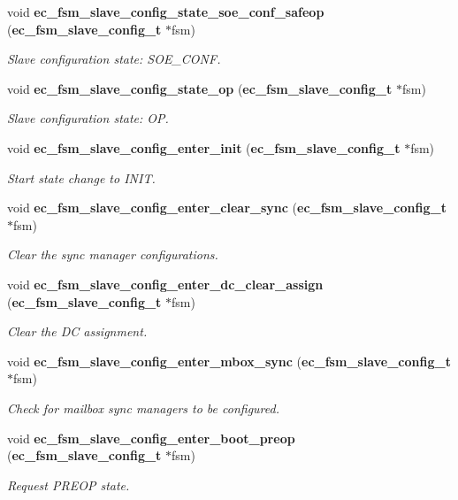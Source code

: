 \begin{DoxyCompactItemize}
void {\bf ec\-\_\-fsm\-\_\-slave\-\_\-config\-\_\-state\-\_\-soe\-\_\-conf\-\_\-safeop} ({\bf ec\-\_\-fsm\-\_\-slave\-\_\-config\-\_\-t} $\ast$fsm)
\begin{DoxyCompactList}\small\item\em Slave configuration state\-: S\-O\-E\-\_\-\-C\-O\-N\-F. \end{DoxyCompactList}\item 
void {\bf ec\-\_\-fsm\-\_\-slave\-\_\-config\-\_\-state\-\_\-op} ({\bf ec\-\_\-fsm\-\_\-slave\-\_\-config\-\_\-t} $\ast$fsm)
\begin{DoxyCompactList}\small\item\em Slave configuration state\-: O\-P. \end{DoxyCompactList}\item 
void {\bf ec\-\_\-fsm\-\_\-slave\-\_\-config\-\_\-enter\-\_\-init} ({\bf ec\-\_\-fsm\-\_\-slave\-\_\-config\-\_\-t} $\ast$fsm)
\begin{DoxyCompactList}\small\item\em Start state change to I\-N\-I\-T. \end{DoxyCompactList}\item 
void {\bf ec\-\_\-fsm\-\_\-slave\-\_\-config\-\_\-enter\-\_\-clear\-\_\-sync} ({\bf ec\-\_\-fsm\-\_\-slave\-\_\-config\-\_\-t} $\ast$fsm)
\begin{DoxyCompactList}\small\item\em Clear the sync manager configurations. \end{DoxyCompactList}\item 
void {\bf ec\-\_\-fsm\-\_\-slave\-\_\-config\-\_\-enter\-\_\-dc\-\_\-clear\-\_\-assign} ({\bf ec\-\_\-fsm\-\_\-slave\-\_\-config\-\_\-t} $\ast$fsm)
\begin{DoxyCompactList}\small\item\em Clear the D\-C assignment. \end{DoxyCompactList}\item 
void {\bf ec\-\_\-fsm\-\_\-slave\-\_\-config\-\_\-enter\-\_\-mbox\-\_\-sync} ({\bf ec\-\_\-fsm\-\_\-slave\-\_\-config\-\_\-t} $\ast$fsm)
\begin{DoxyCompactList}\small\item\em Check for mailbox sync managers to be configured. \end{DoxyCompactList}\item 
void {\bf ec\-\_\-fsm\-\_\-slave\-\_\-config\-\_\-enter\-\_\-boot\-\_\-preop} ({\bf ec\-\_\-fsm\-\_\-slave\-\_\-config\-\_\-t} $\ast$fsm)
\begin{DoxyCompactList}\small\item\em Request P\-R\-E\-O\-P state. \end{DoxyCompactList}\item 

\end{DoxyCompactItemize}
